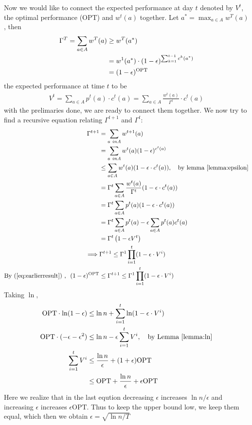 Now we would like to connect the expected performance at day $t$ denoted by $V^t$, the optimal performance (OPT) and $w^t(a)$ together. Let $a^\ast = \max_{a \in A}w^T(a)$, then
\begin{align}
\Gamma^T=\sum_{a \in A} w^T(a) &\geq w^T(a^\ast)\notag\\
&= w^1(a^\ast)\cdot (1-\epsilon)^{\sum_{k=1}^{t-1}c^k(a^\ast)}\notag\\
&=  (1-\epsilon)^{\text{OPT}}\label{eq:earlierresult}
\end{align}
the expected performance at time $t$ to be
\begin{align*}
V^t=\sum_{a\in A}p^t(a)\cdot c^t(a)=\sum_{a \in A}\frac{w^t(a)}{\Gamma^t}\cdot c^t(a)
\end{align*}
with the prelimaries done, we are ready to connect them together. We now try to find a recursive equation relating $\Gamma^{t+1}$ and $\Gamma^t$:
\begin{align*}
\Gamma^{t+1}&=\sum_{a\ in A} w^{t+1}(a)\\
&=\sum_{a\ in A} w^{t}(a)(1-\epsilon)^{c^t(a)}\\
&\leq \sum_{a\in A} w^{t}(a)(1-\epsilon\cdot c^t(a)), \quad \text{by lemma \ref{lemma:epsilon}}\\
&= \Gamma^t\sum_{a\in A} \frac{w^{t}(a)}{\Gamma^t}(1-\epsilon\cdot c^t(a))\\
&= \Gamma^t\sum_{a\in A} p^{t}(a)(1-\epsilon\cdot c^t(a))\\
&= \Gamma^t\sum_{a\in A} p^{t}(a)-\epsilon\sum_{a\in A}p^t(a) c^t(a)\\
&= \Gamma^t\left(1-\epsilon V^t\right)\\
\implies& \Gamma^{t+1} \leq \Gamma^1 \prod_{i=1}^{t}(1-\epsilon\cdot V^i)\\
\text{By (\ref{eq:earlierresult})	,}~~(1-\epsilon)^{\text{OPT}}&\leq\Gamma^{t+1} \leq \Gamma^1 \prod_{i=1}^{t}(1-\epsilon\cdot V^i)
\end{align*}
Taking $\ln$,
\begin{align*}
\text{OPT}\cdot \ln(1-\epsilon)&\leq \ln n + \sum_{i=1}^{t} \ln (1-\epsilon \cdot V^i)\\
\text{OPT}\cdot (-\epsilon-\epsilon^2)&\leq \ln n - \epsilon\sum_{i=1}^{t}  V^i, \quad \text{by Lemma \ref{lemma:ln}}\\
\sum_{i=1}^{t}  V^i &\leq \frac{\ln n}{\epsilon}+(1+\epsilon)\text{OPT}\\
&\leq \text{OPT}+\frac{\ln n}{\epsilon}+\epsilon\text{OPT}
\end{align*}
Here we realize that in the last eqution decreasing $\epsilon$ increases $\ln n /\epsilon$ and increasing $\epsilon$ increases $\epsilon \text{OPT}$. Thus to keep the upper bound low, we keep them equal, which then we obtain $\epsilon = \sqrt{\ln n /T}$

